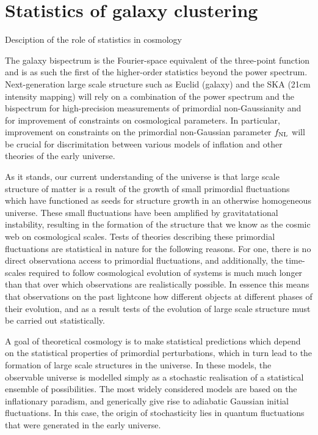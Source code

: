 \section{Statistics of galaxy clustering}
\label{section:introbisp}

Desciption of the role of statistics in cosmology

The galaxy bispectrum is the Fourier-space equivalent of the three-point function and is as such the first of the higher-order statistics beyond the power spectrum. Next-generation large scale structure such as Euclid (galaxy) and the SKA (21cm intensity mapping) will rely on a combination of the power spectrum and the bispectrum for high-precision measurements of primordial non-Gaussianity and for improvement of constraints on cosmological parameters. In particular, improvement on constraints on the primordial non-Gaussian parameter $f_\text{NL}$ will be crucial for discrimitation between various models of inflation and other theories of the early universe. 

As it stands, our current understanding of the universe is that large scale structure of matter is a result of the growth of small primordial fluctuations which have functioned as seeds for structure growth in an otherwise homogeneous universe. These small fluctuations have been amplified by gravitatational instability, resulting in the formation of the structure that we know as the cosmic web on cosmological scales. Tests of theories describing these primordial fluctuations are statistical in nature for the following reasons. For one, there is no direct observationa access to primordial fluctuations, and additionally, the time-scales required to follow cosmological evolution of systems is much much longer than that over which observations are realistically possible. In essence this means that observations on the past lightcone how different objects at different phases of their evolution, and as a result tests of the evolution of large scale structure must be carried out statistically. 

A goal of theoretical cosmology is to make statistical predictions which depend on the statistical properties of primordial perturbations, which in turn lead to the formation of large scale structures in the universe. In these models, the observable universe is modelled simply as a stochastic realisation of a statistical ensemble of possibilities. The most widely considered models are based on the inflationary paradism, and generically give rise to adiabatic Gaussian initial fluctuations. In this case, the origin of stochasticity lies in quantum fluctuations that were generated in the early universe. 

